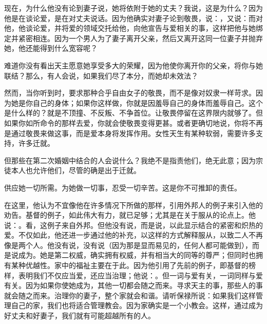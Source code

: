 现在，为什么他没有论到妻子说，她将依附于她的丈夫？我说，这是为什么？因为他是在谈论爱，是在对丈夫说话。因为他确实对妻子论到敬畏，说：，又说：而对他，他谈论爱，并将爱的领域交托给他，向他宣告与爱相关的事，这样把他与她绑定并紧密相连。因为一个男人为了妻子离开父亲，然后又离开这同一位妻子并抛弃她，他还能得到什么宽容呢？\par

难道你没有看出天主愿意她享受多大的荣耀，因为他使你离开你的父亲，将你与她联结？那么，有人会说，如果我们尽了本分，而她却未效法？\par

然而，当你听到时，要求那种合乎自由女子的敬畏，而不是像对奴隶一样苛求。因为她是你自己的身体；如果你这样做，你就是因羞辱自己的身体而羞辱自己。这个是什么样的？就是不顶撞、不反叛、不争首位。让敬畏停留在这界限内就够了。但如果你如所命令的那样去爱，你就会使敬畏变得更甚。或者更确切地说，你将不再是通过敬畏来做这事，而是爱本身将发挥作用。女性天生有某种软弱，需要许多支持，许多迁就。\par

但那些在第二次婚姻中结合的人会说什么？我绝不是指责他们，绝无此意；因为宗徒本人也允许他们，尽管的确是出于迁就。\par

供应她一切所需。为她做一切事，忍受一切辛苦。这是你不可推卸的责任。\par

在这里，他认为不宜像他在许多情况下所做的那样，引用外邦人的例子来引入他的劝告。基督的例子，如此伟大有力，就已足够；尤其是在关于服从的论点上。他说：。看，这例子来自外邦。但他没有说，而是说，以此显示结合的紧密和炽热的爱。不仅如此，他还进一步通过他的补充，以这样的方式解释服从，以致二人不再像是两个人。他没有说，没有说（因为那是显而易见的，任何人都可能做到），而是说成为。她是第二权威，确实拥有权威，并有相当大的同等的尊严；但同时也拥有某种优越性。家中的福祉主要在于此。因为他引用了先前的例子，即基督的榜样，表明我们不仅应当爱，还应当治理；他说：。但一词与爱有关，一词同样与爱有关。因为如果你使她成为，其他一切都会随之而来。寻求天主的事，那些人的事就会随之而来。治理你的妻子，整个家就会和谐。请听保禄所说：如果我们这样管理自己的家，我们也将适合管理教会。因为家确实是一个小教会。这样，通过成为好丈夫和好妻子，我们就有可能超越所有的人。\par

